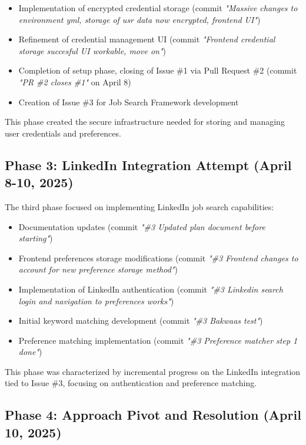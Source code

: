 \documentclass[a4paper,12pt]{article}
\begin{document}
\begin{itemize}
    \item Implementation of encrypted credential storage (commit \textit{"Massive changes to environment yml, storage of usr data now encrypted, frontend UI"})
    \item Refinement of credential management UI (commit \textit{"Frontend credential storage succesful UI workable, move on"})
    \item Completion of setup phase, closing of Issue \#1 via Pull Request \#2 (commit \textit{"PR \#2 closes \#1"} on April 8)
    \item Creation of Issue \#3 for Job Search Framework development
\end{itemize}

This phase created the secure infrastructure needed for storing and managing user credentials and preferences.

\subsection{Phase 3: LinkedIn Integration Attempt (April 8-10, 2025)}

The third phase focused on implementing LinkedIn job search capabilities:

\begin{itemize}
    \item Documentation updates (commit \textit{"\#3 Updated plan document before starting"})
    \item Frontend preferences storage modifications (commit \textit{"\#3 Frontend changes to account for new preference storage method"})
    \item Implementation of LinkedIn authentication (commit \textit{"\#3 Linkedin search login and navigation to preferences works"})
    \item Initial keyword matching development (commit \textit{"\#3 Bakwaas test"})
    \item Preference matching implementation (commit \textit{"\#3 Preference matcher step 1 done"})
\end{itemize}

This phase was characterized by incremental progress on the LinkedIn integration tied to Issue \#3, focusing on authentication and preference matching.

\subsection{Phase 4: Approach Pivot and Resolution (April 10, 2025)}
\end{document}

